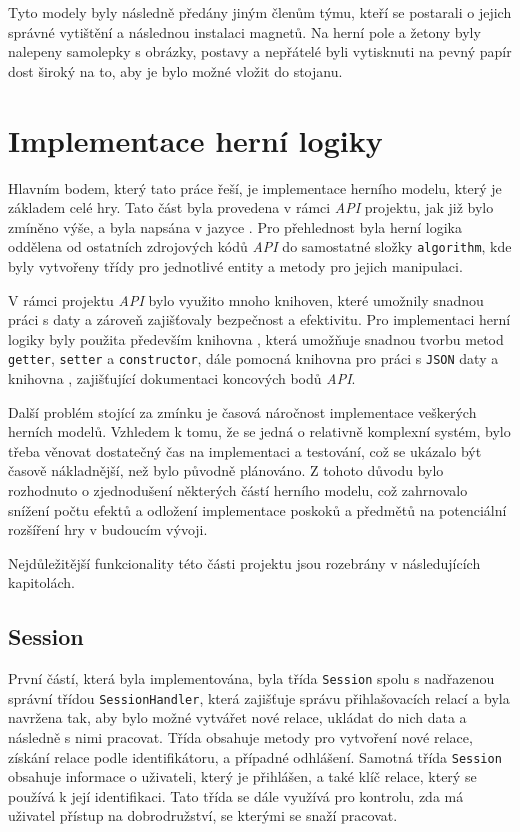 Tyto modely byly následně předány jiným členům týmu, kteří se postarali o jejich správné vytištění a následnou instalaci magnetů. Na herní pole a žetony byly nalepeny samolepky s obrázky, postavy a nepřátelé byli vytisknuti na pevný papír dost široký na to, aby je bylo možné vložit do stojanu.

\section{Implementace herní logiky}
\label{sec:game_logic}

Hlavním bodem, který tato práce řeší, je implementace herního modelu, který je základem celé hry. Tato část byla provedena v rámci \textit{API} projektu, jak již bylo zmíněno výše, a byla napsána v jazyce . Pro přehlednost byla herní logika oddělena od ostatních zdrojových kódů \textit{API} do samostatné složky \texttt{algorithm}, kde byly vytvořeny třídy pro jednotlivé entity a metody pro jejich manipulaci.

V rámci projektu \textit{API} bylo využito mnoho knihoven, které umožnily snadnou práci s daty a zároveň zajišťovaly bezpečnost a efektivitu. Pro implementaci herní logiky byly použita především knihovna , která umožňuje snadnou tvorbu metod \texttt{getter}, \texttt{setter} a \texttt{constructor}, dále pomocná knihovna  pro práci s \texttt{JSON} daty a knihovna , zajišťující dokumentaci koncových bodů \textit{API}.

Další problém stojící za zmínku je časová náročnost implementace veškerých herních modelů. Vzhledem k tomu, že se jedná o relativně komplexní systém, bylo třeba věnovat dostatečný čas na implementaci a testování, což se ukázalo být časově nákladnější, než bylo původně plánováno. Z tohoto důvodu bylo rozhodnuto o zjednodušení některých částí herního modelu, což zahrnovalo snížení počtu efektů a odložení implementace poskoků a předmětů na potenciální rozšíření hry v budoucím vývoji.

Nejdůležitější funkcionality této části projektu jsou rozebrány v následujících kapitolách.

\subsection{Session}
\label{subsec:impl_session}

První částí, která byla implementována, byla třída \texttt{Session} spolu s nadřazenou správní třídou \texttt{SessionHandler}, která zajišťuje správu přihlašovacích relací a byla navržena tak, aby bylo možné vytvářet nové relace, ukládat do nich data a následně s nimi pracovat. Třída obsahuje metody pro vytvoření nové relace, získání relace podle identifikátoru, a případné odhlášení. Samotná třída \texttt{Session} obsahuje informace o uživateli, který je přihlášen, a také klíč relace, který se používá k její identifikaci. Tato třída se dále využívá pro kontrolu, zda má uživatel přístup na dobrodružství, se kterými se snaží pracovat.


